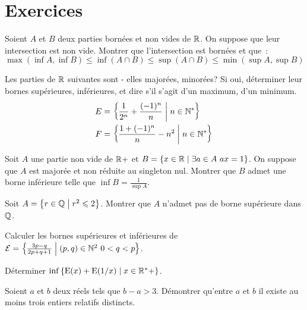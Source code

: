 \clearpage

\section{Exercices}

\begin{exercice}
  Soient \(A\) et \(B\) deux parties bornées et non vides de \(\mathbb{R}\). On suppose
  que leur intersection est non vide. Montrer que l'intersection est bornées et
  que~:
  \[\max(\inf A, \inf B) \leqslant \inf(A \cap B) \leqslant \sup(A \cap B)
  \leqslant \min(\sup A, \sup B)\]
\end{exercice}

\begin{exercice}
  Les parties de \(\mathbb{R}\) suivantes sont - elles majorées, minorées? Si oui,
  déterminer leur bornes supérieures, inférieures, et dire s'il s'agit d'un
  maximum, d'un minimum.
  \begin{align*}
    E &= \left\{\frac{1}{2^n} + \frac{( - 1)^n}{n}\mathrel{}\middle|\mathrel{}n \in \mathbb{N}^*\right\} \\
    F &= \left\{\frac{1 + ( - 1)^n}{n} - n^2\mathrel{}\middle|\mathrel{}n \in \mathbb{N}^*\right\}
  \end{align*}
\end{exercice}

\begin{exercice}
  Soit \(A\) une partie non vide de \(\mathbb{R} + \) et \(B = \left\{x \in \mathbb{R}\mathrel{}\middle|\mathrel{}\exists
  a \in A \ ax = 1\right\}\). On suppose que \(A\) est majorée et non réduite au
  singleton nul. Montrer que \(B\) admet une borne inférieure telle que \(\inf B
  = \frac{1}{\sup A}\).
\end{exercice}

\begin{exercice}
  Soit \(A = \left\{r \in \mathbb{Q}\mathrel{}\middle|\mathrel{}r^2 \leqslant 2\right\}\). Montrer que \(A\) n'admet pas
  de borne supérieure dans \(\mathbb{Q}\).
\end{exercice}

\begin{exercice}
  Calculer les bornes supérieures et inférieures de \(\mathcal{E} =
  \left\{\frac{3p - q}{2p + q + 1}\mathrel{}\middle|\mathrel{}(p, q) \in \mathbb{N}^2 \ 0 <q<p\right\}\).
\end{exercice}

\begin{exercice}
  Déterminer \(\inf \left\{\operatorname{E}(x) + \operatorname{E}(1/x)\mathrel{}\middle|\mathrel{}x \in \mathbb{R}^* + \right\}\).
\end{exercice}

\begin{exercice}
  Soient \(a\) et \(b\) deux réels tels que \(b - a>3\). Démontrer qu'entre
  \(a\) et \(b\) il existe au moins trois entiers relatifs distincts.
\end{exercice}

